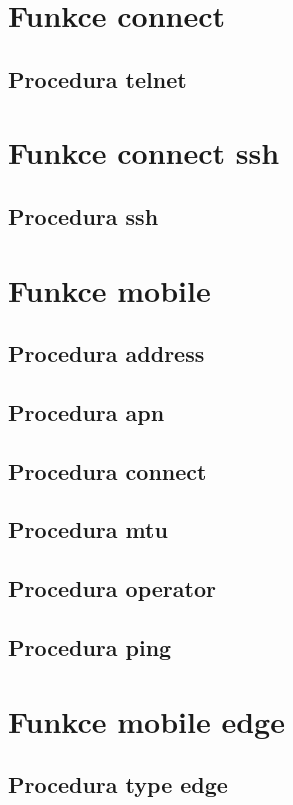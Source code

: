 \section{Funkce connect}
\subsection{Procedura telnet}

\section{Funkce connect ssh}
\subsection{Procedura ssh}

\section{Funkce mobile}
\subsection{Procedura address}
\subsection{Procedura apn}
\subsection{Procedura connect}
\subsection{Procedura mtu}
\subsection{Procedura operator}
\subsection{Procedura ping}

\section{Funkce mobile edge}
\subsection{Procedura type edge}

